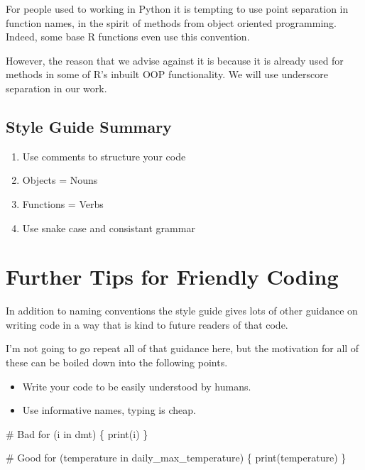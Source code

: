\documentclass[
  letterpaper,
  DIV=11,
  numbers=noendperiod]{scrreprt}
\newenvironment{Shaded}{\begin{snugshade}}{\end{snugshade}}
\newcommand{\CommentTok}[1]{\textcolor[rgb]{0.37,0.37,0.37}{#1}}
\newcommand{\ControlFlowTok}[1]{\textcolor[rgb]{0.00,0.23,0.31}{#1}}
\newcommand{\FunctionTok}[1]{\textcolor[rgb]{0.28,0.35,0.67}{#1}}
\newcommand{\NormalTok}[1]{\textcolor[rgb]{0.00,0.23,0.31}{#1}}
\providecommand{\tightlist}{%
  \setlength{\itemsep}{0pt}\setlength{\parskip}{0pt}}\usepackage{longtable,booktabs,array}
\begin{document}
For people used to working in Python it is tempting to use point
separation in function names, in the spirit of methods from object
oriented programming. Indeed, some base R functions even use this
convention.

However, the reason that we advise against it is because it is already
used for methods in some of R's inbuilt OOP functionality. We will use
underscore separation in our work.

\subsection{Style Guide Summary}\label{style-guide-summary}

\begin{enumerate}
\def\labelenumi{\arabic{enumi}.}
\tightlist
\item
  Use comments to structure your code
\item
  Objects = Nouns
\item
  Functions = Verbs
\item
  Use snake case and consistant grammar
\end{enumerate}

\section{Further Tips for Friendly
Coding}\label{further-tips-for-friendly-coding}

In addition to naming conventions the style guide gives lots of other
guidance on writing code in a way that is kind to future readers of that
code.

I'm not going to go repeat all of that guidance here, but the motivation
for all of these can be boiled down into the following points.

\begin{itemize}
\item
  Write your code to be easily understood by humans.
\item
  Use informative names, typing is cheap.
\end{itemize}

\begin{Shaded}
\begin{Highlighting}[]
\CommentTok{\# Bad}
\ControlFlowTok{for}\NormalTok{ (i }\ControlFlowTok{in}\NormalTok{ dmt) \{}
  \FunctionTok{print}\NormalTok{(i)}
\NormalTok{\}}

\CommentTok{\# Good}
\ControlFlowTok{for}\NormalTok{ (temperature }\ControlFlowTok{in}\NormalTok{ daily\_max\_temperature) \{}
  \FunctionTok{print}\NormalTok{(temperature)}
\NormalTok{\}}
\end{Highlighting}
\end{Shaded}
\end{document}
